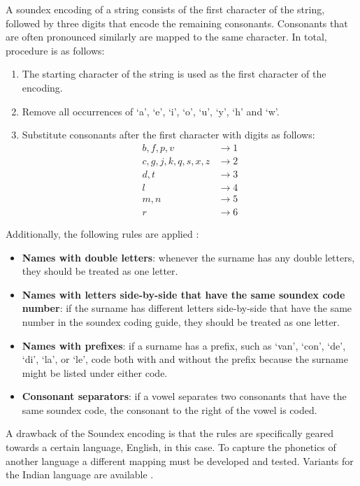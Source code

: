 A soundex encoding of a string consists of the first character of the string, followed by three digits that encode the remaining consonants.
Consonants that are often pronounced similarly are mapped to the same character.
In total, procedure is as follows:

\begin{enumerate}
    \item The starting character of the string is used as the first character of the encoding.
    \item Remove all occurrences of `a', `e', `i', `o', `u', `y', `h' and `w'.
    \item Substitute consonants after the first character with digits as follows:\\
            \begin{align*}
                b, f, p, v &\rightarrow 1 \\
                c, g, j, k, q, s, x, z &\rightarrow 2 \\
                d, t &\rightarrow 3 \\
                l &\rightarrow 4 \\
                m, n &\rightarrow 5 \\
                r &\rightarrow 6
            \end{align*}
\end{enumerate}

Additionally, the following rules are applied \citep{Soundex}:

\begin{itemize}
    \item \textbf{Names with double letters}: whenever the surname has any double letters, they should be treated as one letter.
    \item \textbf{Names with letters side-by-side that have the same soundex code number}: if the surname has different letters side-by-side that have the same number in the soundex coding guide, they should be treated as one letter.
    \item \textbf{Names with prefixes}: if a surname has a prefix, such as `van', `con', `de', `di', `la', or `le', code both with and without the prefix because the surname might be listed under either code.
    \item \textbf{Consonant separators}: if a vowel separates two consonants that have the same soundex code, the consonant to the right of the vowel is coded.
\end{itemize}

A drawback of the Soundex encoding is that the rules are specifically geared towards a certain language, English, in this case.
To capture the phonetics of another language a different mapping must be developed and tested.
Variants for the Indian language are available \citep{Shah2014}.

